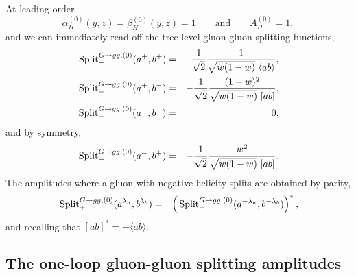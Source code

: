 \documentclass[paper,notoc,nohyper]{JHEP3}
\def\Split{\, {\rm Split}}
\begin{document}
At leading order 
\begin{equation}
\alpha_H^{(0)}(y,z) = \beta_H^{(0)}(y,z) =  1\qquad
\mbox{and}\qquad A_H^{(0)}=1,
\end{equation}
and we can immediately read off the tree-level gluon-gluon 
splitting functions,
\begin{eqnarray}
\Split_{-}^{G \to gg,(0)}(a^{+},b^{+})&=&
\frac{1}{\sqrt{2}} \frac{1}{\sqrt{w(1-w)} ~\langle ab \rangle},\nonumber \\
\Split_{-}^{G \to gg,(0)}(a^{+},b^{-})&=&
-\frac{1}{\sqrt{2}} \frac{(1-w)^2}{\sqrt{w(1-w)} ~[ ab ]},\nonumber \\
\Split_{-}^{G \to gg,(0)}(a^{-},b^{-})&=& 0,
\end{eqnarray}
and by symmetry,
\begin{eqnarray}
\Split_{-}^{G \to gg,(0)}(a^{-},b^{+})&=&
-\frac{1}{\sqrt{2}} \frac{w^2}{\sqrt{w(1-w)} ~[ ab ]}.
\end{eqnarray}
The amplitudes where a gluon with negative helicity splits are obtained by parity,
\begin{eqnarray}
\Split_{+}^{G \to gg,(0)}(a^{\lambda_a},b^{\lambda_b})&=&
\left(\Split_{-}^{G \to gg,(0)}(a^{-\lambda_a},b^{-\lambda_b})\right)^*,
\end{eqnarray}
and recalling that $[ ab ]^* = -\langle ab\rangle$.



\subsection{The one-loop gluon-gluon splitting amplitudes}
\end{document}
